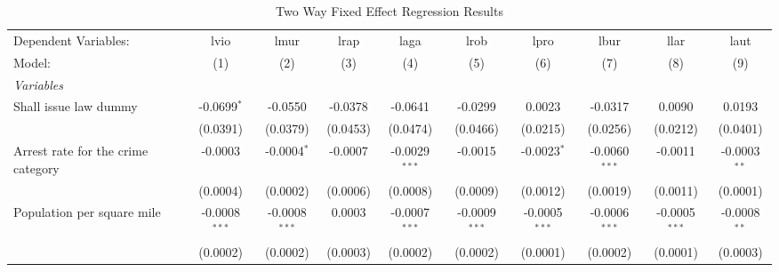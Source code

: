 \documentclass{article}
\begin{document}
\begin{landscape}
\begin{longtable}{@{\extracolsep{5pt}}lccccccccc}
  \caption{Two Way Fixed Effect Regression Results} 
  \label{tab:twfe}
   \tabularnewline \midrule \midrule
   Dependent Variables: & lvio                          & lmur                    & lrap                          & laga                         & lrob                        & lpro                         & lbur                    & llar                          & laut\\  
   Model:               & (1)                           & (2)                     & (3)                           & (4)                          & (5)                         & (6)                          & (7)                     & (8)                           & (9)\\  
   \midrule
   \emph{Variables}\\
   Shall issue law dummy               & -0.0699$^{*}$                 & -0.0550                 & -0.0378                       & -0.0641                      & -0.0299                     & 0.0023                       & -0.0317                 & 0.0090                        & 0.0193\\   
                        & (0.0391)                      & (0.0379)                & (0.0453)                      & (0.0474)                     & (0.0466)                    & (0.0215)                     & (0.0256)                & (0.0212)                      & (0.0401)\\
Arrest rate for the crime category & -0.0003 & -0.0004$^{*}$ & -0.0007 & -0.0029$^{***}$ & -0.0015& -0.0023$^{*}$ &  -0.0060$^{***}$& -0.0011 &-0.0003$^{**}$\\
 & (0.0004)&(0.0002) &(0.0006) & (0.0008)&(0.0009)& (0.0012)& (0.0019)& (0.0011)& (0.0001)\\   
  Population per square mile              & -0.0008$^{***}$               & -0.0008$^{***}$         & 0.0003                        & -0.0007$^{***}$              & -0.0009$^{***}$             & -0.0005$^{***}$              & -0.0006$^{***}$         & -0.0005$^{***}$               & -0.0008$^{**}$\\   
                        & (0.0002)                      & (0.0002)                & (0.0003)                      & (0.0002)                     & (0.0002)                    & (0.0001)                     & (0.0002)                & (0.0001)                      & (0.0003)\\ 

\end{longtable}
\end{landscape}
\end{document}
